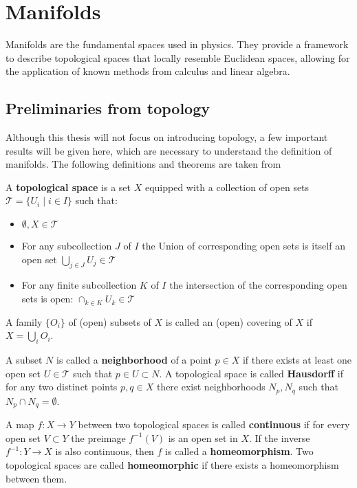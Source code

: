 \chapter{Manifolds}

Manifolds are the fundamental spaces used in physics. They provide a framework to describe topological spaces that locally resemble Euclidean spaces, allowing for the application of known methods from calculus and linear algebra.

\section{Preliminaries from topology}

Although this thesis will not focus on introducing topology, a few important results will be given here, which are necessary to understand the definition of manifolds. The following definitions and theorems are taken from \cite{NakaharaGeometrytopologyphysics2005}

A \textbf{topological space} is a set \( X \) equipped with a collection of open sets \( \mathcal{T} = \{ U_i \mid i\in I\} \) such that:
\begin{itemize}
    \item \( \emptyset, X \in \mathcal{T} \)
    \item For any subcollection $J$ of $I$ the Union of corresponding open sets is itself an open set \( \bigcup_{j\in J} U_j \in \mathcal{T} \)
    \item For any finite subcollection $K$ of $I$ the intersection of the corresponding open sets is open: \( \cap_{k \in K} U_k \in \mathcal{T} \)
\end{itemize}

A family $\{O_i\}$ of (open) subsets of $X$ is called an (open) covering of $X$ if \( X = \bigcup_i O_i \).

A subset $N$ is called a \textbf{neighborhood} of a point \( p \in X \) if there exists at least one open set \( U \in \mathcal{T} \) such that \( p \in U \subset N \). A topological space is called \textbf{Hausdorff} if for any two distinct points \( p, q \in X \) there exist neighborhoods \( N_p, N_q \) such that \( N_p \cap N_q = \emptyset \).

A map \( f: X \to Y \) between two topological spaces is called \textbf{continuous} if for every open set \( V \subset Y \) the preimage \( f^{-1}(V) \) is an open set in \( X \). If the inverse \( f^{-1} : Y \to X \) is also continuous, then \( f \) is called a \textbf{homeomorphism}. Two topological spaces are called \textbf{homeomorphic} if there exists a homeomorphism between them.

